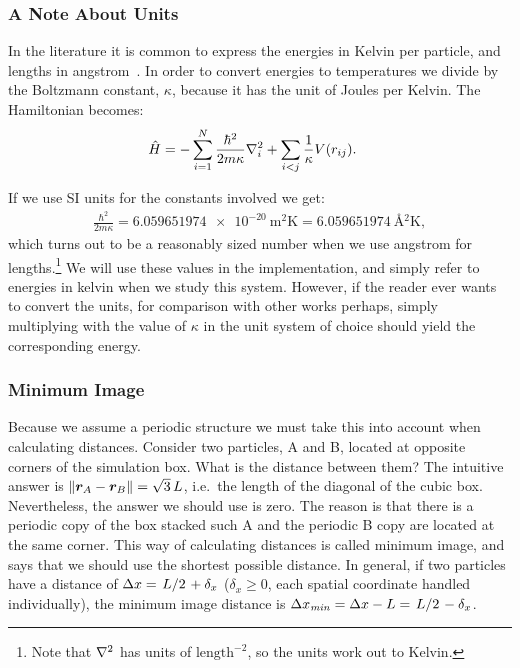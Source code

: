 \documentclass[Thesis.tex]{subfiles}
\begin{document}
\subsubsection{A Note About Units}

In the literature it is common to express the energies in Kelvin per particle,
and lengths in angstrom~\cite{Kalos-1981, Aziz-hfdhe2, ruggeri2018}. In order to convert energies to temperatures we
divide by the Boltzmann constant, $\kappa$, because it has the unit of Joules per
Kelvin. The Hamiltonian becomes:
\begin{align}
  \hat H &= -\sum_{i=1}^N \frac{\hbar^2}{2m\kappa}\laplacian_i + \sum_{i<j}\frac{1}{\kappa}V(r_{ij}).
\end{align}

If we use SI units for the constants involved we get:
\begin{align}
  \frac{\hbar^2}{2m\kappa} = \SI{6.059651974e-20}{\metre^2\kelvin} = \SI{6.059651974}{\angstrom^2\kelvin},
\end{align}
which turns out to be a reasonably sized number when we use angstrom for
lengths.\footnote{Note that $\laplacian$ has units of $\text{length}^{-2}$, so
  the units work out to Kelvin.} We will use these values in the implementation,
and simply refer to energies in kelvin when we study this system. However, if
the reader ever wants to convert the units, for comparison with other works
perhaps, simply multiplying with the value of $\kappa$ in the unit system of
choice should yield the corresponding energy.


\subsubsection{Minimum Image}

Because we assume a periodic structure we must take this into account when
calculating distances. Consider two particles, A and B, located at opposite
corners of the simulation box. What is the distance between them? The intuitive
answer is $\norm{\bm{r}_A - \bm{r}_B} = \sqrt{3}\,L$, i.e.\ the length of the
diagonal of the cubic box. Nevertheless, the answer we should use is zero. The
reason is that there is a periodic copy of the box stacked such A and the
periodic B copy are located at the same corner. This way of calculating
distances is called minimum image, and says that we should use the shortest
possible distance. In general, if two particles have a distance of $\Delta x =
\flatfrac{L}{2} + \delta_x$ ($\delta_x\geq 0$, each spatial coordinate handled
individually), the minimum image distance is $\Delta x_{\mathit{min}} = \Delta x
- L = \flatfrac{L}{2} - \delta_x$.
\end{document}

